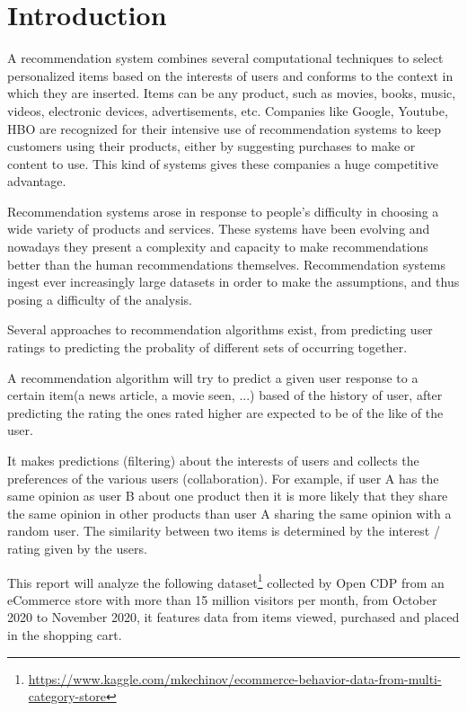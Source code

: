 \section{Introduction}
\label{intro}
A recommendation system combines several computational techniques to select personalized items based on the
interests of users and conforms to the context in which they are inserted.
Items can be any product, such as movies, books, music, videos, electronic devices, advertisements, etc.
Companies like Google, Youtube, HBO are recognized for their intensive use of recommendation systems to 
keep customers using their products, either by suggesting  purchases to make or content to use.
This kind of systems gives these companies a huge competitive advantage.

Recommendation systems arose in response to people's difficulty in choosing a wide variety of products and services.
These systems have been evolving and nowadays they present a complexity and capacity to make recommendations better
than the human recommendations themselves. Recommendation systems ingest ever increasingly large datasets in 
order to make the assumptions, and thus posing a difficulty of the analysis.

Several approaches to recommendation algorithms exist, from predicting user ratings to predicting the probality
of different sets of occurring together.


A recommendation algorithm will try to predict a given user response to a certain item(a news article, a movie seen, ...)
based of the history of user, after predicting the rating the ones rated higher are expected to be of the like
of the user.

It makes predictions (filtering) about the interests of users and collects the preferences of the various users (collaboration).
For example, if user A has the same opinion as user B about one product then it is more likely that they share
the same opinion in other products than user A sharing the same opinion with a random user.
The similarity between two items is determined by the interest / rating given by the users.

This report will analyze the following dataset\footnote{\url{https://www.kaggle.com/mkechinov/ecommerce-behavior-data-from-multi-category-store}} 
collected by Open CDP from an eCommerce store with more than 15 million visitors per month,
from October 2020 to November 2020, it features data from items viewed, purchased and placed in the shopping cart.
